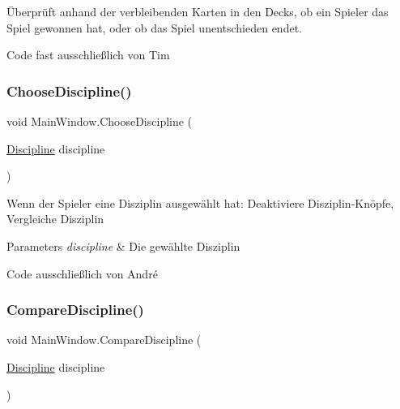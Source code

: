 Überprüft anhand der verbleibenden Karten in den Decks, ob ein Spieler das Spiel gewonnen hat, oder ob das Spiel unentschieden endet. 

Code fast ausschließlich von Tim\mbox{\label{class_main_window_ab0f20d9b5a33f6469d5b837799e534fc}} 
\subsubsection{\texorpdfstring{Choose\+Discipline()}{ChooseDiscipline()}}
{\footnotesize\ttfamily void Main\+Window.\+Choose\+Discipline (\begin{DoxyParamCaption}\item[{\mbox{\hyperlink{namespace_poke_quet_aa425f1b8cf90847021fe1177d6a7199d}{Discipline}}}]{discipline }\end{DoxyParamCaption})\hspace{0.3cm}{\ttfamily [inline]}}



Wenn der Spieler eine Disziplin ausgewählt hat\+: Deaktiviere Disziplin-\/\+Knöpfe, Vergleiche Disziplin 


\begin{DoxyParams}{Parameters}
{\em discipline} & Die gewählte Disziplin\\
\hline
\end{DoxyParams}


Code ausschließlich von André\mbox{\label{class_main_window_a4bbff733cfab680758c3fcc80a0de055}} 
\subsubsection{\texorpdfstring{Compare\+Discipline()}{CompareDiscipline()}}
{\footnotesize\ttfamily void Main\+Window.\+Compare\+Discipline (\begin{DoxyParamCaption}\item[{\mbox{\hyperlink{namespace_poke_quet_aa425f1b8cf90847021fe1177d6a7199d}{Discipline}}}]{discipline }\end{DoxyParamCaption})\hspace{0.3cm}{\ttfamily [inline]}}



